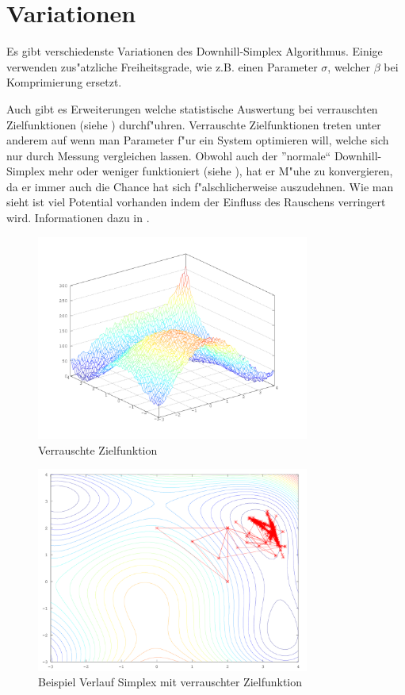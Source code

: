 \section{Variationen}
Es gibt verschiedenste Variationen des Downhill-Simplex Algorithmus.
Einige verwenden zus"atzliche Freiheitsgrade, wie z.B. einen Parameter
$\sigma$, welcher $\beta$ bei Komprimierung ersetzt.

Auch gibt es Erweiterungen welche statistische Auswertung bei verrauschten
Zielfunktionen (siehe ) durchf"uhren.
Verrauschte Zielfunktionen treten unter anderem auf wenn man Parameter
f"ur ein System optimieren will, welche sich nur durch Messung vergleichen
lassen. Obwohl auch der ''normale`` Downhill-Simplex mehr oder weniger
funktioniert (siehe ), hat er M"uhe zu
konvergieren, da er immer auch die Chance hat sich f"alschlicherweise
auszudehnen. Wie man sieht ist viel Potential vorhanden indem der
Einfluss des Rauschens verringert wird.
Informationen dazu in \cite{bib:rauschen}.
\begin{figure}[h]
\centering
\includegraphics[width=0.8\textwidth]{downhill/himmelblauoverview.png}
\caption{Verrauschte Zielfunktion}
\label{fig:downhillRauschen1}
\end{figure}

\begin{figure}[h]
\centering
\includegraphics[width=0.8\textwidth]{downhill/himmelblauall.png}
\caption{Beispiel Verlauf Simplex mit verrauschter Zielfunktion}
\label{fig:downhillRauschen2}
\end{figure}
